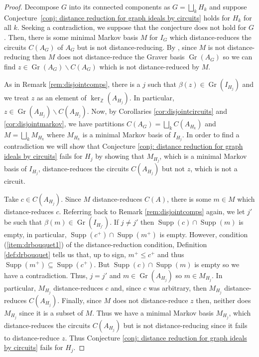 \documentclass[a4paper, 12pt]{article}
\newcommand{\ZZ}{\mathbb Z}
\theoremstyle{plain}
\theoremstyle{definition}
\theoremstyle{remark}
\begin{document}

\begin{proof}
    
   Decompose $G$ into its connected components as $G=\bigsqcup_{k} H_k$ and suppose Conjecture~\ref{conj: distance reduction for graph ideals by circuits} holds for $H_k$ for all $k$. Seeking a contradiction, we suppose that the conjecture does not hold for $G$. Then, there is some minimal Markov basis $M$ for $I_G$ which distance-reduces the circuits $C(A_G)$ of $A_G$ but is not distance-reducing. By \cite[Theorem 7.4]{CK_2024}, since $M$ is not distance-reducing then $M$ does not distance-reduce the Graver basis $\operatorname{Gr}(A_G)$ so we can find $z \in \operatorname{Gr}(A_G) \backslash C(A_G)$ which is not distance-reduced by $M$. 
   
   As in Remark \ref{rem:disjointcomps}, there is a $j$ such that $\beta(z) \in \operatorname{Gr}(I_{H_j})$ and we treat $z$ as an element of $\ker_\ZZ(A_{H_j})$. In particular, $z \in \operatorname{Gr}(A_{H_j}) \backslash C(A_{H_j})$. Now, by Corollaries \ref{cor:disjointcircuits} and \ref{cor:disjointmarkov}, we have partitions $C(A_G)=\bigsqcup_k C(A_{H_k})$ and $M=\bigsqcup_k M_{H_k}$ where $M_{H_k}$ is a minimal Markov basis of $I_{H_j}$. In order to find a contradiction we will show that Conjecture \ref{conj: distance reduction for graph ideals by circuits} fails for $H_j$ by showing that $M_{H_j}$, which is a minimal Markov basis of $I_{H_j}$, distance-reduces the circuits $C(A_{H_j})$ but not $z$, which is not a circuit. 
   
   Take $c \in C(A_{H_j})$. Since $M$ distance-reduces $C(A)$, there is some $m \in M$ which distance-reduces $c$. Referring back to Remark \ref{rem:disjointcomps} again, we let $j'$ be such that $\beta(m) \in \operatorname{Gr}(I_{H_{j'}})$. If $j \neq j'$ then $\operatorname{Supp}(c) \cap \operatorname{Supp}(m)$ is empty, in particular, $\operatorname{Supp}(c^+) \cap \operatorname{Supp}(m^+)$ is empty. However, condition (\ref{item:drbouquet1}) of the distance-reduction condition, Definition \ref{def:drbouquet} tells us that, up to sign, $m^+ \le c^+$ and thus $\operatorname{Supp}(m^+) \subseteq \operatorname{Supp}(c^+)$. But $\operatorname{Supp}(c) \cap \operatorname{Supp}(m)$ is empty so we have a contradiction. Thus, $j=j'$ and $m \in \operatorname{Gr}(A_{H_j})$ so $m \in M_{H_j}$. In particular, $M_{H_j}$ distance-reduces $c$ and, since $c$ was arbitrary, then $M_{H_j}$ distance-reduces $C(A_{H_j})$. Finally, since $M$ does not distance-reduce $z$ then, neither does $M_{H_j}$ since it is a subset of $M$. Thus we have a minimal Markov basis $M_{H_j}$, which distance-reduces the circuits $C(A_{H_j})$ but is not distance-reducing since it fails to distance-reduce $z$. Thus Conjecture \ref{conj: distance reduction for graph ideals by circuits} fails for $H_j$.
\end{proof}
\end{document}
